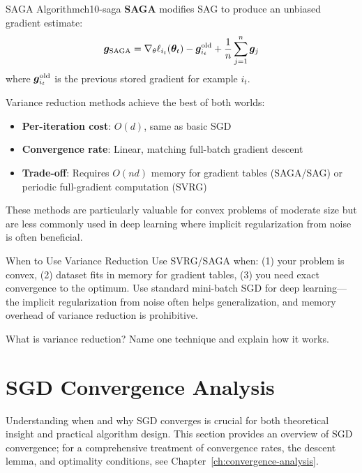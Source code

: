 \documentclass[../../main.tex]{subfiles}
\begin{document}
\begin{definition}{SAGA Algorithm}{ch10-saga}
\textbf{SAGA} modifies SAG to produce an unbiased gradient estimate:
\[
    \boldsymbol{g}_{\text{SAGA}} = \nabla_\theta \ell_{i_t}(\boldsymbol{\theta}_t) - \boldsymbol{g}_{i_t}^{\text{old}} + \frac{1}{n}\sum_{j=1}^n \boldsymbol{g}_j
\]
where $\boldsymbol{g}_{i_t}^{\text{old}}$ is the previous stored gradient for example $i_t$.
\end{definition}

\begin{keyconcept}
Variance reduction methods achieve the best of both worlds:
\begin{itemize}
    \item \textbf{Per-iteration cost}: $O(d)$, same as basic SGD
    \item \textbf{Convergence rate}: Linear, matching full-batch gradient descent
    \item \textbf{Trade-off}: Requires $O(nd)$ memory for gradient tables (SAGA/SAG) or periodic full-gradient computation (SVRG)
\end{itemize}
These methods are particularly valuable for convex problems of moderate size but are less commonly used in deep learning where implicit regularization from noise is often beneficial.
\end{keyconcept}

\begin{keyconcept}{When to Use Variance Reduction}
Use SVRG/SAGA when: (1) your problem is convex, (2) dataset fits in memory for gradient tables, (3) you need exact convergence to the optimum. Use standard mini-batch SGD for deep learning---the implicit regularization from noise often helps generalization, and memory overhead of variance reduction is prohibitive.
\end{keyconcept}

\begin{checkpoint}
What is variance reduction? Name one technique and explain how it works.
\end{checkpoint}

\section{SGD Convergence Analysis}
\label{sec:ch10-sgd-convergence}

Understanding when and why SGD converges is crucial for both theoretical insight and practical algorithm design. This section provides an overview of SGD convergence; for a comprehensive treatment of convergence rates, the descent lemma, and optimality conditions, see Chapter~\ref{ch:convergence-analysis}.
\end{document}
